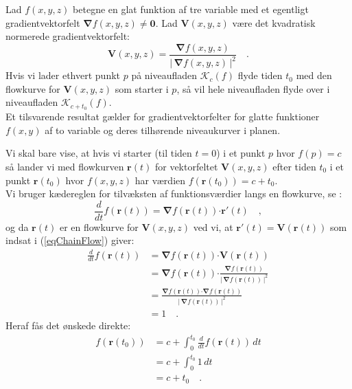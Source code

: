 \begin{theorem} \label{thmLevelFlow}
Lad $f(x,y,z)$ betegne en glat funktion af tre variable med et egentligt gradientvektorfelt $\bm{\nabla}f(x,y,z) \neq \mathbf{0}$.
Lad $\mathbf{V}(x,y,z)$ være det kvadratisk normerede gradientvektorfelt:
\begin{equation}
\mathbf{V}(x,y,z) = \frac{\bm{\nabla}f(x,y,z)}{|\, \bm{\nabla}f(x,y,z)\,|^{2}} \quad .
\end{equation}
Hvis vi lader ethvert punkt $p$ på niveaufladen $\mathcal{K}_{c}(f)$ flyde tiden $t_{0}$ med den flowkurve for $\mathbf{V}(x,y,z)$ som starter i $p$, så vil hele niveaufladen flyde over i niveaufladen $\mathcal{K}_{c+t_{0}}(f)$.\\

Et tilsvarende resultat gælder  for gradientvektorfelter for glatte funktioner $f(x,y)$ af to variable og deres tilhørende niveaukurver i planen.
\end{theorem}
\begin{bevis}
Vi skal bare vise, at hvis vi starter (til tiden $t=0$) i et punkt $p$ hvor $f(p) = c$ så lander vi med flowkurven $\mathbf{r}(t)$ for vektorfeltet $\mathbf{V}(x,y,z)$ efter tiden $t_{0}$ i et punkt $\mathbf{r}(t_{0})$ hvor $f(x,y,z)$ har værdien $f(\mathbf{r}(t_{0})) = c + t_{0}$. \\

 Vi bruger kædereglen for tilvæksten af funktionsværdier langs en flowkurve, se :
\begin{equation} \label{eqChainFlow}
\frac{d}{dt}f(\mathbf{r}(t)) = \bm{\nabla}f(\mathbf{r}(t)) \bm{\cdot} \mathbf{r}'(t) \quad ,
\end{equation}
og da $\mathbf{r}(t)$ er en flowkurve for $\mathbf{V}(x,y,z)$ ved vi, at $\mathbf{r}'(t) = \mathbf{V}(\mathbf{r}(t))$ som indsat i (\ref{eqChainFlow}) giver:
\begin{equation}
\begin{aligned}
\frac{d}{dt}f(\mathbf{r}(t)) &= \bm{\nabla}f(\mathbf{r}(t)) \bm{\cdot} \mathbf{V}(\mathbf{r}(t)) \\
&= \bm{\nabla}f(\mathbf{r}(t)) \bm{\cdot} \frac{\bm{\nabla}f(\mathbf{r}(t))}{|\, \bm{\nabla}f(\mathbf{r}(t))\,|^{2}}  \\
& = \frac{\bm{\nabla}f(\mathbf{r}(t)) \bm{\cdot} \bm{\nabla}f(\mathbf{r}(t))}{|\, \bm{\nabla}f(\mathbf{r}(t))\,|^{2}}  \\
&= 1 \quad .
\end{aligned}
\end{equation}
Heraf fås det ønskede direkte:
\begin{equation}
\begin{aligned}
f(\mathbf{r}(t_{0})) &= c + \int_{0}^{t_{0}} \frac{d}{dt}f(\mathbf{r}(t)) \, dt \\
&= c + \int_{0}^{t_{0}} 1 \, dt \\
&= c + t_{0} \quad .
\end{aligned}
\end{equation}
\end{bevis}


